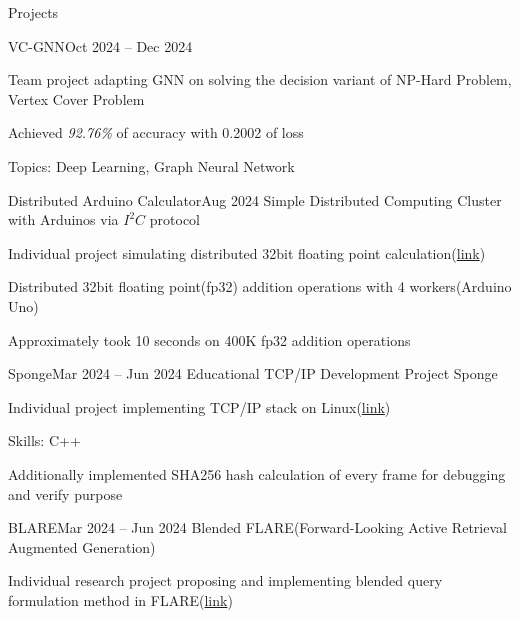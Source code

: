 \documentclass{resume}
\begin{document}
\begin{rSection}{Projects}
\begin{rSubsection}{VC-GNN}{Oct 2024 -- Dec 2024}
        \item Team project adapting GNN on solving the decision variant of NP-Hard Problem, Vertex Cover Problem

        \item Achieved \emph{92.76\%} of accuracy with 0.2002 of loss

        \item Topics: Deep Learning, Graph Neural Network
    \end{rSubsection}


    \begin{rSubsection}{Distributed Arduino Calculator}{Aug 2024}
        Simple Distributed Computing Cluster with Arduinos via $I^2C$ protocol

        \item Individual project simulating distributed 32bit floating point calculation(\href{https://github.com/minsusun/kakashi/tree/main/avr/arduino/i2c-distributed-floating-point-calculator}{link})

        \item Distributed 32bit floating point(fp32) addition operations with 4 workers(Arduino Uno)

        \item Approximately took 10 seconds on 400K fp32 addition operations
    \end{rSubsection}

    \begin{rSubsection}{Sponge}{Mar 2024 -- Jun 2024}
        Educational TCP/IP Development Project Sponge

        \item Individual project implementing TCP/IP stack on Linux(\href{https://github.com/minsusun/csed353-sponge}{link})

        \item Skills: C++

        \item Additionally implemented SHA256 hash calculation of every frame for debugging and verify purpose
    \end{rSubsection}

    \begin{rSubsection}{BLARE}{Mar 2024 -- Jun 2024}
        Blended FLARE(Forward-Looking Active Retrieval Augmented Generation)

        \item Individual research project proposing and implementing blended query formulation method in FLARE(\href{https://github.com/minsusun/BLARE}{link})


\end{rSubsection}
\end{rSection}
\end{document}
